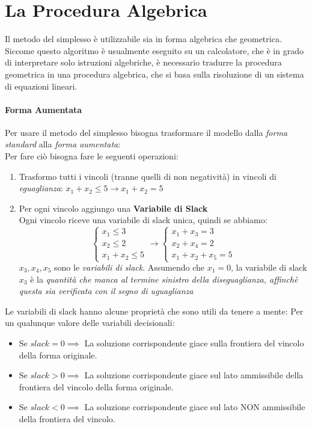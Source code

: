 \documentclass[12pt, a4paper, openany]{book}
\begin{document}
\section{La Procedura Algebrica}
Il metodo del simplesso è utilizzabile sia in forma algebrica che geometrica.
Siccome questo algoritmo è usualmente eseguito su un calcolatore, che è in grado di interpretare solo istruzioni algebriche,
è necessario tradurre la procedura geometrica in una procedura algebrica, che si basa sulla risoluzione di un sistema di equazioni lineari.
\paragraph*{Forma Aumentata}
Per usare il metodo del simplesso bisogna trasformare il modello dalla \emph{forma standard} alla \emph{forma aumentata}:
\\Per fare ciò bisogna fare le seguenti operazioni:
\begin{enumerate}
    \item Trasformo tutti i vincoli (tranne quelli di non negatività) in vincoli di \emph{eguaglianza}:
    $ x_1 +  x_2 \leq 5 \to  x_1 + x_2 = 5$ 
    \item Per ogni vincolo aggiungo una \textbf{Variabile di Slack}
    \\Ogni vincolo riceve una variabile di slack unica, quindi se abbiamo:
    \[
        \begin{cases}
            x_1 \leq 3 \\
            x_2 \leq 2 \\
            x_1 + x_2 \leq 5
        \end{cases}
        \to
        \begin{cases}
            x_1 + x_3 = 3 \\
            x_2 + x_4= 2 \\
            x_1 + x_2 + x_5 = 5 
        \end{cases}
    \]
    $x_3,x_4,x_5$ sono le \emph{variabili di slack}.
    Assumendo che $x_1 = 0$, la variabile di slack $x_3$ è la \emph{quantità che manca al termine sinistro della diseguaglianza,
    affinchè questa sia verificata con il segno di uguaglianza }
\end{enumerate}
Le variabili di slack hanno alcune proprietà che sono utili da tenere a mente: 
Per un qualunque valore delle variabili decisionali:
\begin{itemize}
    \item Se $slack = 0 \implies$ La soluzione corrispondente giace sulla frontiera del vincolo della forma originale.
    \item Se $slack > 0 \implies$ La soluzione corrispondente giace sul lato ammissibile della frontiera del vincolo della forma originale.
    \item Se $slack < 0 \implies$ La soluzione corrispondente giace sul lato NON ammissibile della frontiera del vincolo.
\end{itemize}
\end{document}
